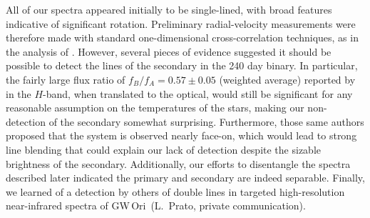\documentclass[twocolumn]{aastex61}
\newcommand{\gw}{GW\,Ori}
\begin{document}
All of our spectra appeared initially to be single-lined, with broad features indicative of significant rotation. Preliminary radial-velocity measurements were therefore made with standard one-dimensional cross-correlation techniques, as in the analysis of \cite{mathieu91}. However, several pieces of evidence suggested it should be possible to detect the lines of the secondary in the 240 day binary. In particular, the fairly large flux ratio of $f_B/f_A = 0.57 \pm 0.05$ (weighted average) reported by \cite{berger11} in the $H$-band, when translated to the optical, would still be significant for any reasonable assumption on the temperatures of the stars, making our non-detection of the secondary somewhat surprising. Furthermore, those same authors proposed that the system is observed nearly face-on, which would lead to strong line blending that could explain our lack of detection despite the sizable brightness of the secondary. Additionally, our efforts to disentangle the spectra described later indicated the primary and secondary are indeed separable. Finally, we learned of a detection by others of double lines in targeted high-resolution near-infrared spectra of \gw\ (L.\ Prato, private communication).
\end{document}
